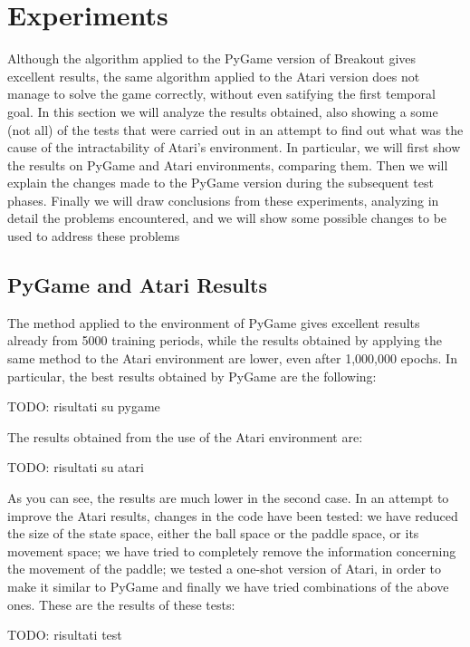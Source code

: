 \section{Experiments}
\label{subsec:experiments}

Although the algorithm applied to the PyGame version of Breakout gives
excellent results, the same algorithm applied to the Atari version does not
manage to solve the game correctly, without even satifying the first
temporal goal.
In this section we will analyze the results obtained, also showing a some (not all) of the tests that were carried out in an attempt to find out what was the cause of the intractability of Atari's environment. In particular, we will first show the results on PyGame and Atari environments, comparing them. Then we will explain the changes made to the PyGame version during the subsequent test phases. Finally we will draw conclusions from these experiments, analyzing in detail the problems encountered, and we will show some possible changes to be used to address these problems

\subsection{PyGame and Atari Results}

The method applied to the environment of PyGame gives excellent results already from 5000 training periods, while the results obtained by applying the same method to the Atari environment are lower, even after 1,000,000 epochs. In particular, the best results obtained by PyGame are the following:

\smallskip
TODO: risultati su pygame
\smallskip

The results obtained from the use of the Atari environment are:

\smallskip
TODO: risultati su atari
\smallskip

As you can see, the results are much lower in the second case. In an attempt to improve the Atari results, changes in the code have been tested: we have reduced the size of the state space, either the ball space or the paddle space, or its movement space; we have tried to completely remove the information concerning the movement of the paddle; we tested a one-shot version of Atari, in order to make it similar to PyGame and finally we have tried combinations of the above ones. These are the results of these tests:

\smallskip
TODO: risultati test
\smallskip

